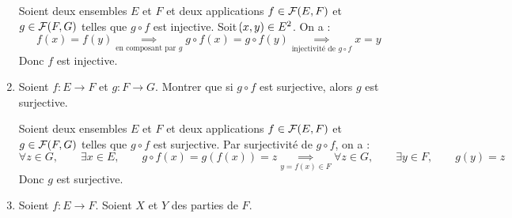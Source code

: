 \documentclass[a4paper,french,bookmarks]{book}
\begin{document}
\begin{enumerate}
        \noafter
        \nobefore
        \yesafter
        \begin{nproof}
            Soient deux ensembles $E$ et $F$ et deux applications $f \in \mathcal{F}\!\left(E, F\right)$ et $g \in \mathcal{F}\!\left(F, G\right)$ telles que $g \circ f$ est injective. Soit $\!\left(x, y\right) \in E^2$. On a :
            \[ f(x) = f(y) \underset{\text{en composant par } g}{\implies} g \circ f(x) = g \circ f(y) \underset{\text{injectivité de } g \circ f}{\implies} x = y\]
            Donc $f$ est injective.
        \end{nproof}
        \yesbefore
        
        \item Soient $f : E \to F$ et $g : F \to G$. Montrer que si $g \circ f$ est surjective, alors $g$ est surjective.
        
        \noafter
        \nobefore
        \yesafter
        \begin{nproof}
            Soient deux ensembles $E$ et $F$ et deux applications $f \in \mathcal{F}\!\left(E, F\right)$ et $g \in \mathcal{F}\!\left(F, G\right)$ telles que $g \circ f$ est surjective. Par surjectivité de $g \circ f$, on a :
            \[ \forall z \in G,\qquad \exists x \in E,\qquad g \circ f (x) = g(f(x)) = z \underset{y = f(x) \in F}{\implies} \forall z \in G,\qquad \exists y \in F,\qquad g(y) = z\]
            Donc $g$ est surjective.
        \end{nproof}
        \yesbefore
        
        \item Soient $f : E \to F$. Soient $X$ et $Y$ des parties de $F$.
        

\end{enumerate}
\end{document}
